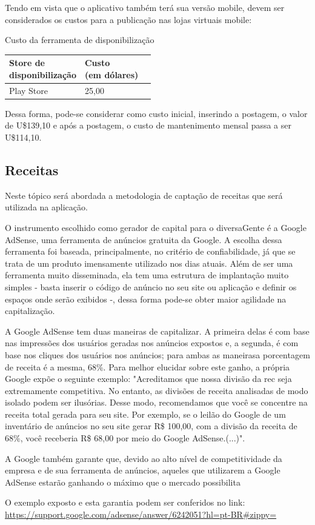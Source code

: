 Tendo em vista que o aplicativo também terá sua versão mobile, devem ser considerados os custos para a publicação nas lojas virtuais mobile: 

\begin{quadro}[htb]
	\centering
	\ABNTEXfontereduzida
	\caption[Custo da ferramenta de disponibilização]{Custo da ferramenta de disponibilização}
	\label{quadro-exemplo}
	\begin{tabular}{|p{4.0cm}|p{4.0cm}|p{3.0cm}|}
		\hline
		\thead{Store de\\ disponibilização} & \thead{Custo\\(em dólares)} \\
		\hline
		Play Store & 25,00 \\
		\hline
	\end{tabular}
\end{quadro}

Dessa forma, pode-se considerar como custo inicial, inserindo a postagem, o valor de U\$139,10 e após a postagem, o custo de mantenimento mensal passa a ser U\$114,10.

\subsection{Receitas}

Neste tópico será abordada a metodologia de captação de receitas que será utilizada na aplicação.

O instrumento escolhido como gerador de capital para o diversaGente é a Google AdSense, uma ferramenta de anúncios gratuita da Google. A escolha dessa ferramenta foi baseada, principalmente, no critério de confiabilidade, já que se trata de um produto imensamente utilizado nos dias atuais. Além de ser uma ferramenta muito disseminada, ela tem uma estrutura de implantação muito simples - basta inserir o código de anúncio no seu site ou aplicação e definir os espaços onde serão exibidos -, dessa forma pode-se obter maior agilidade na capitalização.

A Google AdSense tem duas maneiras de capitalizar. A primeira delas é com base nas impressões dos usuários geradas nos anúncios expostos e, a segunda, é com base nos cliques dos usuários nos anúncios; para ambas as maneirasa porcentagem de receita é a mesma, 68\%. Para melhor elucidar sobre este ganho, a própria Google expõe o seguinte exemplo: "Acreditamos que nossa divisão da rec seja extremamente competitiva. No entanto, as divisões de receita analisadas de modo isolado podem ser ilusórias. Desse modo, recomendamos que você se concentre na receita total gerada para seu site. Por exemplo, se o leilão do Google de um inventário de anúncios no seu site gerar R\$ 100,00, com a divisão da receita de 68\%, você receberia R\$ 68,00 por meio do Google AdSense.(...)". 

A Google também garante que, devido ao alto nível de competitividade da empresa e de sua ferramenta de anúncios, aqueles que utilizarem a Google AdSense estarão ganhando o máximo que o mercado possibilita

O exemplo exposto e esta garantia podem ser conferidos no link:\\ \hyperlink{Link da Google AdSense}{https://support.google.com/adsense/answer/6242051?hl=pt-BR#zippy=}

